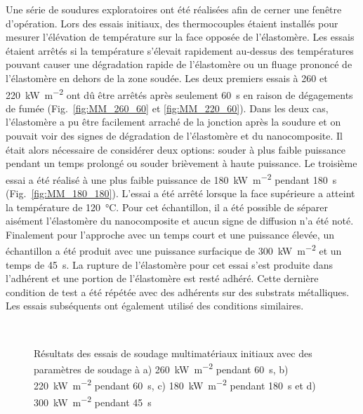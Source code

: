 Une série de soudures exploratoires ont été réalisées afin de cerner une fenêtre d'opération. 
Lors des essais initiaux, des thermocouples étaient installés pour mesurer l'élévation de température sur la face opposée de l'élastomère. 
Les essais étaient arrêtés si la température s'élevait rapidement au-dessus des températures pouvant causer une dégradation rapide de l'élastomère ou un fluage prononcé de l'élastomère en dehors de la zone soudée. 
Les deux premiers essais à 260 et \SI[locale=FR]{220}{\kilo\watt\per\square\metre} ont dû être arrêtés après seulement \SI[locale=FR]{60}{\second} en raison de dégagements de fumée (Fig.~\ref{fig:MM_260_60} et \ref{fig:MM_220_60}). 
Dans les deux cas, l'élastomère a pu être facilement arraché de la jonction après la soudure et on pouvait voir des signes de dégradation de l'élastomère et du nanocomposite. 
Il était alors nécessaire de considérer deux options: souder à plus faible puissance pendant un temps prolongé ou souder brièvement à haute puissance. 
Le troisième essai a été réalisé à une plus faible puissance de \SI[locale=FR]{180}{\kilo\watt\per\square\metre} pendant \SI[locale=FR]{180}{\second} (Fig.~\ref{fig:MM_180_180}). 
L'essai a été arrêté lorsque la face supérieure a atteint la température de \SI[locale=FR]{120}{\celsius}. 
Pour cet échantillon, il a été possible de séparer aisément l'élastomère du nanocomposite et aucun signe de diffusion n'a été noté. 
Finalement pour l'approche avec un temps court et une puissance élevée, un échantillon a été produit avec une puissance surfacique de \SI[locale=FR]{300}{\kilo\watt\per\square\metre} et un temps de \SI[locale=FR]{45}{\second}. 
La rupture de l'élastomère pour cet essai s'est produite dans l'adhérent et une portion de l'élastomère est resté adhéré. 
Cette dernière condition de test a été répétée avec des adhérents sur des substrats métalliques. 
Les essais subséquents ont également utilisé des conditions similaires. 

\FloatBarrier
\begin{figure}[h]
	\centering
	 \qquad
	 \\
	
	 \qquad
	\caption{Résultats des essais de soudage multimatériaux initiaux avec des paramètres de soudage à a) \SI{260}{\kilo\watt\per\square\metre} pendant \SI{60}{\second}, b) \SI{220}{\kilo\watt\per\square\metre} pendant \SI{60}{\second}, c) \SI{180}{\kilo\watt\per\square\metre} pendant \SI{180}{\second} et d) \SI{300}{\kilo\watt\per\square\metre} pendant \SI{45}{\second}}
	\label{fig:MM_essais_initiaux}
\end{figure}
\FloatBarrier

